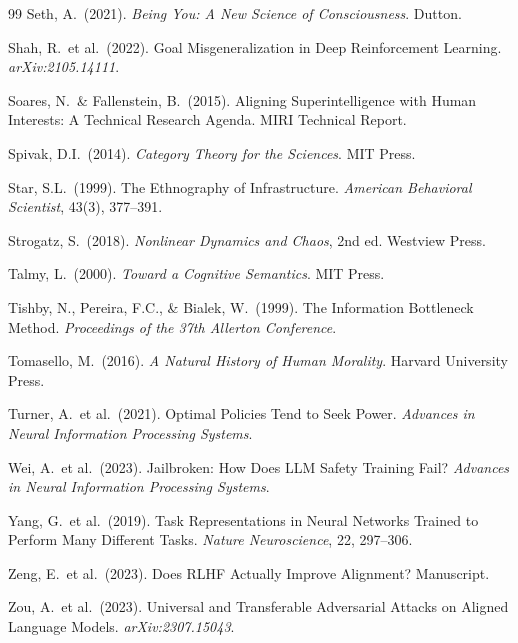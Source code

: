 \documentclass[12pt]{article}
\theoremstyle{definition}
\begin{document}
\begin{thebibliography}{99}
Seth, A.\ (2021).
\newblock \emph{Being You: A New Science of Consciousness}.
\newblock Dutton.

Shah, R.\ et al.\ (2022).
\newblock Goal Misgeneralization in Deep Reinforcement Learning.
\newblock \emph{arXiv:2105.14111}.

Soares, N.\ \& Fallenstein, B.\ (2015).
\newblock Aligning Superintelligence with Human Interests: A Technical Research
Agenda.
\newblock MIRI Technical Report.

Spivak, D.I.\ (2014).
\newblock \emph{Category Theory for the Sciences}.
\newblock MIT Press.

Star, S.L.\ (1999).
\newblock The Ethnography of Infrastructure.
\newblock \emph{American Behavioral Scientist}, 43(3), 377--391.

Strogatz, S.\ (2018).
\newblock \emph{Nonlinear Dynamics and Chaos}, 2nd ed.
\newblock Westview Press.

Talmy, L.\ (2000).
\newblock \emph{Toward a Cognitive Semantics}.
\newblock MIT Press.

Tishby, N., Pereira, F.C., \& Bialek, W.\ (1999).
\newblock The Information Bottleneck Method.
\newblock \emph{Proceedings of the 37th Allerton Conference}.

Tomasello, M.\ (2016).
\newblock \emph{A Natural History of Human Morality}.
\newblock Harvard University Press.

Turner, A.\ et al.\ (2021).
\newblock Optimal Policies Tend to Seek Power.
\newblock \emph{Advances in Neural Information Processing Systems}.

Wei, A.\ et al.\ (2023).
\newblock Jailbroken: How Does LLM Safety Training Fail?
\newblock \emph{Advances in Neural Information Processing Systems}.

Yang, G.\ et al.\ (2019).
\newblock Task Representations in Neural Networks Trained to Perform Many
Different Tasks.
\newblock \emph{Nature Neuroscience}, 22, 297--306.

Zeng, E.\ et al.\ (2023).
\newblock Does RLHF Actually Improve Alignment?
\newblock Manuscript.

Zou, A.\ et al.\ (2023).
\newblock Universal and Transferable Adversarial Attacks on Aligned Language
Models.
\newblock \emph{arXiv:2307.15043}.

\end{thebibliography}
\end{document}

